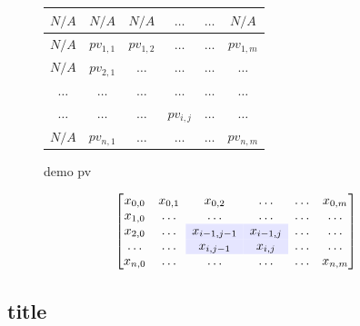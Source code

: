\begin{figure}
	\centering
	\begin{tabular}{|c | c |c | c |c | c |} \hline
		\rowcolor{lightgray}
		\cellcolor{lightgray}$N/A$   & $N/A$       & $N/A$       & $\dots$                        & $\dots$ & $N/A$       \\ \hline
		\cellcolor{lightgray}$N/A$   & $pv_{1, 1}$ & $pv_{1, 2}$ & $\dots$                        & $\dots$ & $pv_{1, m}$ \\ \hline
		\cellcolor{lightgray}$N/A$   & $pv_{2, 1}$ & $\dots$     & $\dots$                        & $\dots$ & $\dots$     \\ \hline 
		\cellcolor{lightgray}$\dots$ & $\dots$     & $\dots$     & $\dots$                        & $\dots$ & $\dots$     \\ \hline 
		\cellcolor{lightgray}$\dots$ & $\dots$     & $\dots$     & \cellcolor{blue!10}$pv_{i, j}$ & $\dots$ & $\dots$     \\ \hline 
		\cellcolor{lightgray}$N/A$   & $pv_{n, 1}$ & $\dots$     & $\dots$                        & $\dots$ & $pv_{n, m}$ \\ \hline 
	\end{tabular}
	\caption{demo pv}
\end{figure}

\begin{equation*}
	\begin{bmatrix}
	x_{0, 0} & x_{0, 1} & x_{0, 2}                         & \dots                           & \dots & x_{0, m} \\ 
	x_{1, 0} & \dots    & \dots                            & \dots                           & \dots & \dots    \\ 
	x_{2, 0} & \dots    & \cellcolor{blue!10} x_{i-1, j-1} & \cellcolor{blue!10}x_{i - 1, j} & \dots & \dots    \\ 
	\dots    & \dots    & \cellcolor{blue!10}x_{i, j - 1}  & \cellcolor{blue!10}x_{i, j}     & \dots & \dots    \\ 
	x_{n, 0} & \dots    & \dots                            & \dots                           & \dots & x_{n, m} \\ 
	\end{bmatrix}
\end{equation*}

\subsection{title}

